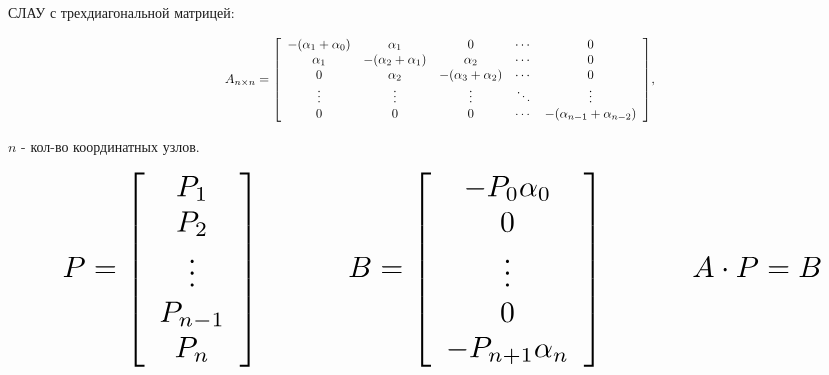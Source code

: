 \documentclass[14pt, aspectratio=169]{beamer}
\begin{document}
\begin{frame}{}
    СЛАУ с трехдиагональной матрицей:

    \begin{equation*}
        \resizebox{.9\hsize}{!}{
            $A_{n\times n} =
            \left[ {\begin{array}{ccccc}
                -(\alpha_{1} + \alpha_{0}) & \alpha_{1} & 0 & \cdots & 0\\
                \alpha_{1}  & -(\alpha_{2} + \alpha_{1}) &  \alpha_{2}  & \cdots & 0\\
                0  &  \alpha_{2}  & -(\alpha_{3} + \alpha_{2}) & \cdots & 0\\
                \vdots & \vdots & \vdots & \ddots & \vdots\\
                0 & 0 & 0 & \cdots & -(\alpha_{n-1} + \alpha_{n-2})\\
            \end{array} } \right]
            $,}
    \end{equation*}

    $n$ - кол-во координатных узлов.

    \begin{equation*}
        \resizebox{1\vsize}{!}{
            $
            P = \left[ {\begin{array}{c}
                        P_1 \\
                        P_2 \\
                        \vdots \\
                        P_{n-1} \\
                        P_n
                        \end{array}}\right]
            \hspace{1cm}
            B = \left[ {\begin{array}{c}
                        -P_0 \alpha_0 \\
                        0 \\
                        \vdots \\
                        0 \\
                        -P_{n+1}\alpha_{n}
                        \end{array}}\right]
            \hspace{1cm}
            A \cdot P = B$}
    \end{equation*}

\end{frame}
\end{document}
